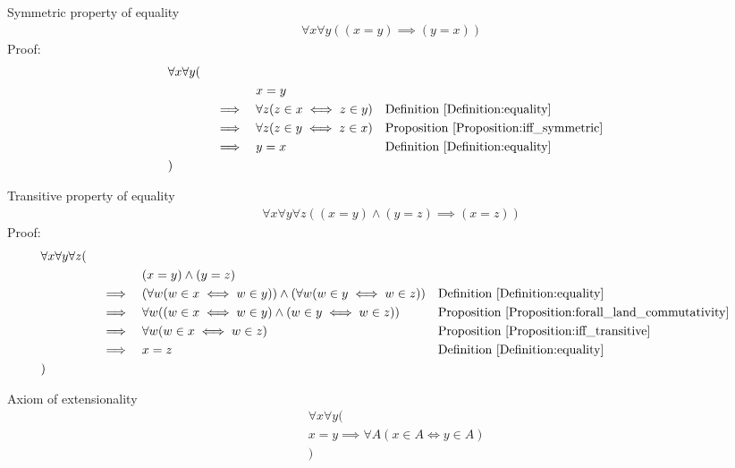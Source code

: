 \begin{prop}
Symmetric property of equality
\begin{align*}
\forall x \forall y ((x = y) \implies (y=x))
\end{align*}
Proof:
\begin{align*}
& \forall x \forall y ( \\
& \quad &&  &&  x = y \\
& \quad && \implies &&  \forall z (z \in x \iff z \in y)
&& \text{Definition \ref{Definition:equality}} \\
& \quad && \implies &&  \forall z (z \in y \iff z \in x)
&& \text{Proposition \ref{Proposition:iff_symmetric}} \\
& \quad && \implies && y = x
&& \text{Definition \ref{Definition:equality}} \\
& )
\end{align*}
\end{prop}

\begin{prop}
Transitive property of equality
\begin{align*}
\forall x \forall y \forall z ((x = y) \land (y=z) \implies (x=z))
\end{align*}
Proof:
\begin{align*}
& \forall x \forall y \forall z ( \\
& \quad &&  &&  (x = y) \land (y=z) \\
& \quad && \implies && ( \forall w (w \in x \iff w \in y)) \land ( \forall w (w \in y \iff w \in z))
&& \text{Definition \ref{Definition:equality}} \\
& \quad && \implies && \forall w ((w \in x \iff w \in y) \land (w \in y \iff w \in z))
&& \text{Proposition \ref{Proposition:forall_land_commutativity}} \\
& \quad && \implies && \forall w (w \in x \iff w \in z)
&& \text{Proposition \ref{Proposition:iff_transitive}} \\
& \quad && \implies && x = z
&& \text{Definition \ref{Definition:equality}} \\
& )
\end{align*}
\end{prop}

\begin{axm}
Axiom of extensionality
\begin{align*}
& \forall x \forall y ( \\
& x = y \implies \forall A (x \in A  \iff y \in A) \\
& )
\end{align*}
\end{axm}

